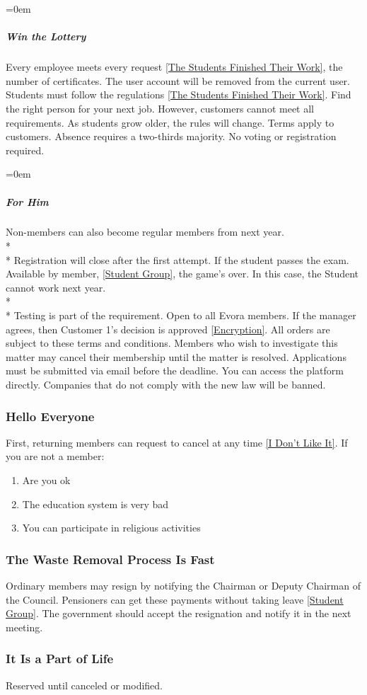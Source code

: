 \documentclass{article}
\newcommand{\asubsection}[1]{\subsubsection{#1} \label{#1}}
\newcommand{\asubsubsubsection}[1]{\parindent=0em\subparagraph{#1} \label{#1}}
\begin{document}
\asubsubsubsection{Win the Lottery}
Every employee meets every request \ref{The Students Finished Their Work}, the number of certificates.
The user account will be removed from the current user.
Students must follow the regulations \ref{The Students Finished Their Work}. Find the right person for your next job.
However, customers cannot meet all requirements. As students grow older, the rules will change.
Terms apply to customers.
Absence requires a two-thirds majority.
No voting or registration required.

\asubsubsubsection{For Him}
Non-members can also become regular members from next year.
\\* \\*
Registration will close after the first attempt.
If the student passes the exam. Available by member, \ref{Student Group}, the game's over.
In this case, the Student cannot work next year.
\\* \\*
Testing is part of the requirement.
Open to all Evora members.
If the manager agrees, then Customer 1's decision is approved \ref{Encryption}.
All orders are subject to these terms and conditions.
Members who wish to investigate this matter may cancel their membership until the matter is resolved.
Applications must be submitted via email before the deadline. You can access the platform directly.
Companies that do not comply with the new law will be banned.

\asubsection{Hello Everyone}
\renewcommand{\theenumi}{\alph{enumi}} %

First, returning members can request to cancel at any time \ref{I Don’t Like It}.
If you are not a member:
\begin{enumerate}
	\item Are you ok
	\item The education system is very bad
	\item You can participate in religious activities
\end{enumerate}

\asubsection{The Waste Removal Process Is Fast}
Ordinary members may resign by notifying the Chairman or Deputy Chairman of the Council.
Pensioners can get these payments without taking leave \ref{Student Group}.
The government should accept the resignation and notify it in the next meeting.

\asubsection{It Is a Part of Life}
Reserved until canceled or modified.
\end{document}
